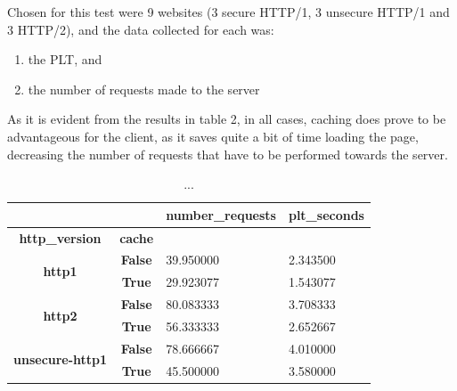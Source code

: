\documentclass[a4paper,10pt]{article}
\begin{document}
Chosen for this test were 9 websites (3 secure HTTP/1, 3 unsecure HTTP/1 and 3 HTTP/2), and the data collected for each was: 


\begin{enumerate}

\item the PLT, and
\item the number of requests made to the server

\end{enumerate}

As it is evident from the results in table 2, in all cases, caching does prove to be advantageous for the client, as it saves quite a bit of time loading the page, decreasing the number of requests that have to be performed towards the server.

\begin{table}[h!]
\centering
\begin{tabular}{|c|c|l|l|}
\hline
\multicolumn{1}{|r|}{\textbf{}}          & \multicolumn{1}{r|}{\textbf{}} & \multicolumn{1}{r|}{\textbf{number\_requests}} & \multicolumn{1}{r|}{\textbf{plt\_seconds}} \\ \hline
\textbf{http\_version}                   & \textbf{cache}                 & \multicolumn{1}{c|}{\textbf{}}                 & \multicolumn{1}{c|}{\textbf{}}             \\ \hline
\multirow{2}{*}{\textbf{http1}}          & \textbf{False}                 & 39.950000                                      & 2.343500                                   \\ \cline{2-4} 
                                         & \textbf{True}                  & 29.923077                                      & 1.543077                                   \\ \hline
\multirow{2}{*}{\textbf{http2}}          & \textbf{False}                 & 80.083333                                      & 3.708333                                   \\ \cline{2-4} 
                                         & \textbf{True}                  & 56.333333                                      & 2.652667                                   \\ \hline
\multirow{2}{*}{\textbf{unsecure-http1}} & \textbf{False}                 & 78.666667                                      & 4.010000                                   \\ \cline{2-4} 
                                         & \textbf{True}                  & 45.500000                                      & 3.580000                                   \\ \hline
\end{tabular}

\caption{...}
\label{fig:table2}
\end{table}
\end{document}
